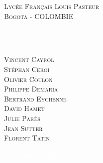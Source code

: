 \thispagestyle{empty}


\vspace{0.5cm}
\begin{center}
     {\color{bleu3} \textsc{\LARGE Lycée Français Louis Pasteur}\\
    \vspace{0.5cm}
    \textsc{\Large Bogota - COLOMBIE}\\
 }
              \vspace{4.5cm}
              

     \begin{center}
        \textcolor{violet}{ {\fontsize{50}{50}\selectfont \bfseries {}} \\
          \vspace{2cm}
          \textbf{{\fontsize{30}{30}\selectfont {\sffamily cycle 4}}}\\
             }
     \end{center}





 
    \begin{minipage}{0.4\textwidth}
      \begin{center} 

     {\color{bleu3} \large{\textsc{Vincent Cayrol}}\\
     \large{\textsc{Stéphan Ceroi}}\\
      \large{\textsc{Olivier Coulon}}\\
      \large{\textsc{Philippe Demaria}}\\
      \large{\textsc{Bertrand Eychenne}}\\
      \large{\textsc{David Hamet}}\\
      \large{\textsc{Julie Parès}}\\ 
       \large{\textsc{Jean Sutter}}\\        
       \large{\textsc{Florent Tatin}}\\          
 }
      \end{center}
    \end{minipage}
     
 \vfill
    {\large \textcolor{white}{Programme 2016}}

  \end{center}   


\newpage


  \tableofcontents 